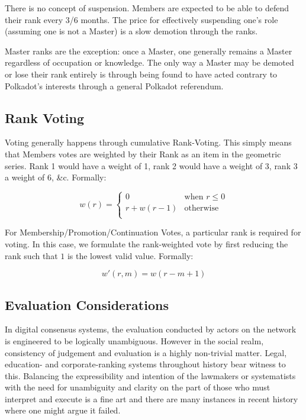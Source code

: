 \documentclass[9pt,oneside]{amsart}
\begin{document}
There is no concept of suspension. Members are expected to be able to defend their rank every 3/6 months. The price for effectively suspending one's role (assuming one is not a Master) is a slow demotion through the ranks.

Master ranks are the exception: once a Master, one generally remains a Master regardless of occupation or knowledge. The only way a Master may be demoted or lose their rank entirely is through being found to have acted contrary to Polkadot's interests through a general Polkadot referendum.

\subsection{Rank Voting}\label{rank-voting}

Voting generally happens through cumulative Rank-Voting. This simply means that Members votes are weighted by their Rank as an item in the geometric series. Rank 1 would have a weight of 1, rank 2 would have a weight of 3, rank 3 a weight of 6, \&c. Formally:

\begin{equation}
  w(r) = \begin{cases}
    0 & \text{when } r \leq 0 \\
    r + w(r - 1) & \text{otherwise} \\
  \end{cases}
\end{equation}

For Membership/Promotion/Continuation Votes, a particular rank is required for voting. In this case, we formulate the rank-weighted vote by first reducing the rank such that $1$ is the lowest valid value. Formally:

\begin{equation}
  w'(r, m) = w(r - m + 1)
\end{equation}

\subsection{Evaluation Considerations}

In digital consensus systems, the evaluation conducted by actors on the network is engineered to be logically unambiguous. However in the social realm, consistency of judgement and evaluation is a highly non-trivial matter. Legal, education- and corporate-ranking systems throughout history bear witness to this. Balancing the expressibility and intention of the lawmakers or systematists with the need for unambiguity and clarity on the part of those who must interpret and execute is a fine art and there are many instances in recent history where one might argue it failed.
\end{document}
